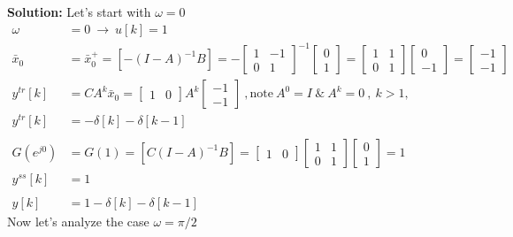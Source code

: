 \documentclass[twoside]{article}
\begin{document}
\textbf{Solution:} Let's start with $\omega = 0$
%
\begin{align*} 
	\omega &= 0 \ \rightarrow \ u[k] = 1
	\\
 	\bar{x}_0 &= \bar{x}_0^+ = \left[ - (I - A)^{-1} B \right] = - \begin{bmatrix} 1 & -1 \\ 0 & 1 \end{bmatrix}^{-1} \begin{bmatrix} 0 \\ 1 \end{bmatrix} = 
	 \begin{bmatrix} 1 & 1 \\ 0 & 1 \end{bmatrix} \begin{bmatrix} 0 \\ -1 \end{bmatrix} = \begin{bmatrix} -1 \\ -1 \end{bmatrix} 
	 \\
	 y^{tr}[k] &= C A^k \bar{x}_0 = \begin{bmatrix} 1 & 0 \end{bmatrix} A^k \begin{bmatrix} -1 \\ -1 \end{bmatrix} \ ,  \mathrm{note} \  A^0 = I \ \& \ A^k = 0 \ , \ k > 1 ,
	 \\
	 y^{tr}[k] &= - \delta[k]  - \delta[k-1]
	 \\
	 \\
	 G(e^{j 0 }) &= G(1) = \left[ C (I - A)^{-1} B \right] = \begin{bmatrix} 1 & 0 \end{bmatrix} \begin{bmatrix} 1 & 1 \\ 0 & 1 \end{bmatrix} \begin{bmatrix} 0 \\ 1 \end{bmatrix} = 1
	 \\
	 y^{ss}[k] &= 1
	 \\
	 \\
	 y[k] &= 1 - \delta[k]  - \delta[k-1]
\end{align*}
%
Now let's analyze the case  $\omega = \pi/2$
\end{document}
